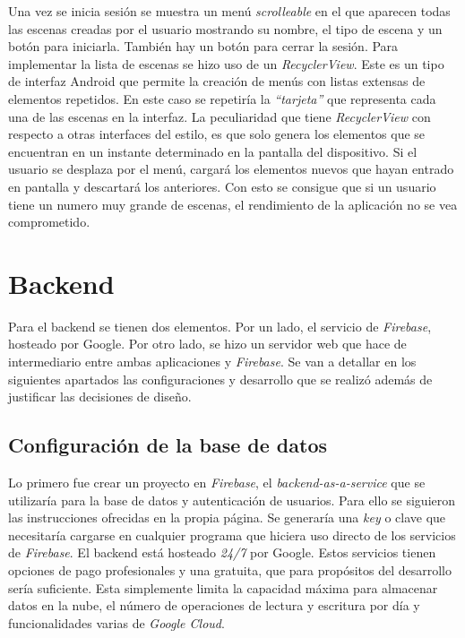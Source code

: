 Una vez se inicia sesión se muestra un menú \textit{scrolleable} en el que aparecen todas las escenas creadas por el usuario mostrando su nombre, el tipo de escena y un botón para iniciarla. También hay un botón para cerrar la sesión. Para implementar la lista de escenas se hizo uso de un \textit{RecyclerView}. Este es un tipo de interfaz Android que permite la creación de menús con listas extensas de elementos repetidos. En este caso se repetiría la \textit{``tarjeta''} que representa cada una de las escenas en la interfaz. La peculiaridad que tiene \textit{RecyclerView} con respecto a otras interfaces del estilo, es que solo genera los elementos que se encuentran en un instante determinado en la pantalla del dispositivo. Si el usuario se desplaza por el menú, cargará los elementos nuevos que hayan entrado en pantalla y descartará los anteriores. Con esto se consigue que si un usuario tiene un numero muy grande de escenas, el rendimiento de la aplicación no se vea comprometido.

\section{Backend}

Para el backend se tienen dos elementos. Por un lado, el servicio de \textit{Firebase}, hosteado por Google. Por otro lado, se hizo un servidor web que hace de intermediario entre ambas aplicaciones y \textit{Firebase}. Se van a detallar en los siguientes apartados las configuraciones y desarrollo que se realizó además de justificar las decisiones de diseño.

\subsection{Configuración de la base de datos}

Lo primero fue crear un proyecto en \textit{Firebase}, el \textit{backend-as-a-service} que se utilizaría para la base de datos y autenticación de usuarios. Para ello se siguieron las instrucciones ofrecidas en la propia página. Se generaría una \textit{key} o clave que necesitaría cargarse en cualquier programa que hiciera uso directo de los servicios de \textit{Firebase}. El backend está hosteado \textit{24/7} por Google. Estos servicios tienen opciones de pago profesionales y una gratuita, que para propósitos del desarrollo sería suficiente. Esta simplemente limita la capacidad máxima para almacenar datos en la nube, el número de operaciones de lectura y escritura por día y funcionalidades varias de \textit{Google Cloud}.

